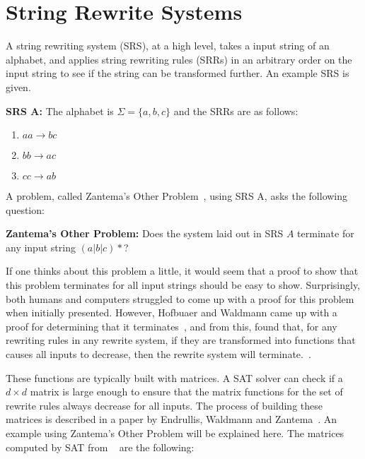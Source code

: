 \section{String Rewrite Systems}
A string rewriting system (SRS), at a high level, takes a input string of an alphabet, and applies string rewriting rules (SRRs) in an arbitrary order on the input string to see if the string can be transformed further.  An example SRS is given.\par\noindent
\textbf{SRS A:} The alphabet is $\Sigma = \{a, b, c\}$ and the SRRs are as follows:
\begin{enumerate}
    \item $aa \rightarrow bc$
    \item $bb \rightarrow ac$
    \item $cc \rightarrow ab$
\end{enumerate}
A problem, called Zantema's Other Problem~\cite{Hofbauer:2006:TA:1142725.1711178}, using SRS A, asks the following question:\par\noindent
\textbf{Zantema's Other Problem:}
Does the system laid out in SRS $A$ terminate for any input string $(a|b|c)*$?\par
If one thinks about this problem a little, it would seem that a proof to show that this problem terminates for all input strings should be easy to show.  Surprisingly, both humans and computers struggled to come up with a proof for this problem when initially presented.  However, Hofbuaer and Waldmann came up with a proof for determining that it terminates~\cite{Hofbauer:2006:TA:1142725.1711178}, and from this, found that, for any rewriting rules in any rewrite system, if they are transformed into functions that causes all inputs to decrease, then the rewrite system will terminate.~\cite{Hofbauer2006}. \par
These functions are typically built with matrices. A SAT solver can check if a $d \times d$ matrix is large enough to ensure that the matrix functions for the set of rewrite rules always decrease for all inputs. The process of building these matrices is described in a paper by Endrullis, Waldmann and Zantema~\cite{Endrullis2006}. An example using Zantema's Other Problem will be explained here. The matrices computed by SAT from ~\cite{Hofbauer:2006:TA:1142725.1711178} are the following:
